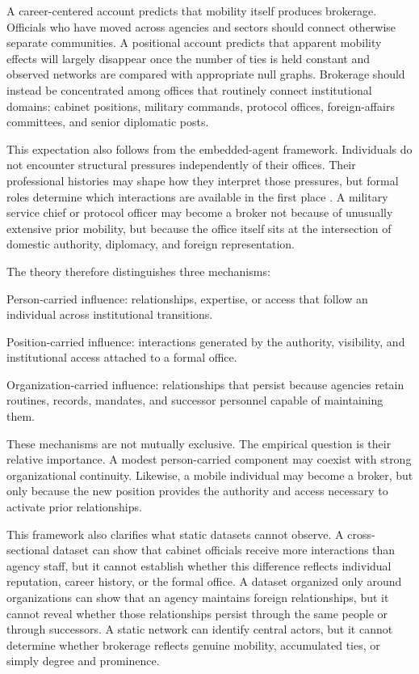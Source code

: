 \documentclass[11pt]{article}
\begin{document}
A career-centered account predicts that mobility itself produces brokerage. Officials who have moved across agencies and sectors should connect otherwise separate communities. A positional account predicts that apparent mobility effects will largely disappear once the number of ties is held constant and observed networks are compared with appropriate null graphs. Brokerage should instead be concentrated among offices that routinely connect institutional domains: cabinet positions, military commands, protocol offices, foreign-affairs committees, and senior diplomatic posts.

This expectation also follows from the embedded-agent framework. Individuals do not encounter structural pressures independently of their offices. Their professional histories may shape how they interpret those pressures, but formal roles determine which interactions are available in the first place \citep{weaver2026bringing}. A military service chief or protocol officer may become a broker not because of unusually extensive prior mobility, but because the office itself sits at the intersection of domestic authority, diplomacy, and foreign representation.

The theory therefore distinguishes three mechanisms:

Person-carried influence: relationships, expertise, or access that follow an individual across institutional transitions.

Position-carried influence: interactions generated by the authority, visibility, and institutional access attached to a formal office.

Organization-carried influence: relationships that persist because agencies retain routines, records, mandates, and successor personnel capable of maintaining them.

These mechanisms are not mutually exclusive. The empirical question is their relative importance. A modest person-carried component may coexist with strong organizational continuity. Likewise, a mobile individual may become a broker, but only because the new position provides the authority and access necessary to activate prior relationships.

This framework also clarifies what static datasets cannot observe. A cross-sectional dataset can show that cabinet officials receive more interactions than agency staff, but it cannot establish whether this difference reflects individual reputation, career history, or the formal office. A dataset organized only around organizations can show that an agency maintains foreign relationships, but it cannot reveal whether those relationships persist through the same people or through successors. A static network can identify central actors, but it cannot determine whether brokerage reflects genuine mobility, accumulated ties, or simply degree and prominence.
\end{document}
